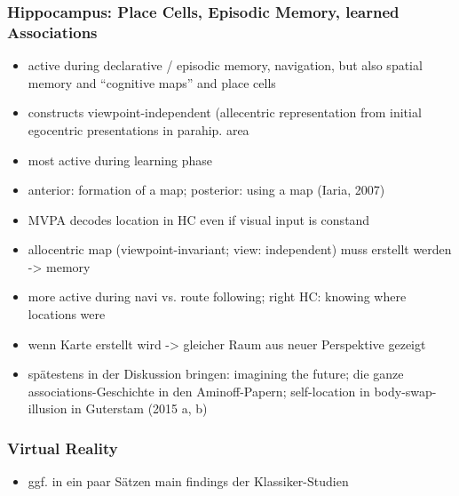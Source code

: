 \documentclass[10pt,a4paper,twocolumn]{article}
\begin{document}
\subsubsection{Hippocampus: Place Cells, Episodic Memory, learned Associations}
\begin{itemize}
	\item active during declarative / episodic memory, navigation, but also
	spatial memory and ``cognitive maps'' and place cells
	\item constructs viewpoint-independent (allecentric representation from
	initial egocentric presentations in parahip. area
	\item most active during learning phase \citep{wolbers_2005_retrosplenial_hippocampal_contributions}
	\item anterior: formation of a map; posterior: using a map (Iaria, 2007)
	\item MVPA decodes location in HC even if visual input is constand
	\item allocentric map (viewpoint-invariant; view: independent) muss erstellt
	werden -> memory
	\item more active during navi vs. route following; right HC: knowing where
	locations were \citep{maguire_1998_knowing_where_and_getting_there}
	\item wenn Karte erstellt wird -> gleicher Raum aus neuer Perspektive gezeigt
	\citep{barense_2010_medial_temproal_effects_viewpoint}
	\item spätestens in der Diskussion bringen: imagining the future; die ganze
	associations-Geschichte in den Aminoff-Papern; self-location in body-swap-illusion
	in Guterstam (2015 a, b)
\end{itemize}

\subsubsection{Virtual Reality}
\begin{itemize}
	\item ggf. in ein paar Sätzen main findings der Klassiker-Studien
\end{itemize}
\end{document}
